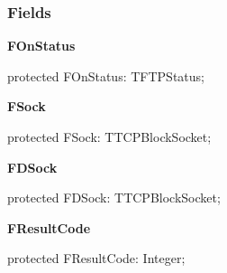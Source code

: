 \documentclass{report}
\newif\ifpdf
\begin{document}
\subsubsection*{\large{\textbf{Fields}}\normalsize\hspace{1ex}\hfill}
\begin{list}{}{
\setlength{\itemindent}{0cm}
\setlength{\listparindent}{0cm}
\setlength{\leftmargin}{\evensidemargin}
\addtolength{\leftmargin}{\tmplength}
\settowidth{\labelsep}{X}
\addtolength{\leftmargin}{\labelsep}
\setlength{\labelwidth}{\tmplength}
}
\label{ftpsend.TFTPSend-FOnStatus}
\item[\textbf{FOnStatus}\hfill]
\ifpdf
\begin{flushleft}
\fi
\begin{ttfamily}
protected FOnStatus: TFTPStatus;\end{ttfamily}

\ifpdf
\end{flushleft}
\fi


\par  \label{ftpsend.TFTPSend-FSock}
\item[\textbf{FSock}\hfill]
\ifpdf
\begin{flushleft}
\fi
\begin{ttfamily}
protected FSock: TTCPBlockSocket;\end{ttfamily}

\ifpdf
\end{flushleft}
\fi


\par  \label{ftpsend.TFTPSend-FDSock}
\item[\textbf{FDSock}\hfill]
\ifpdf
\begin{flushleft}
\fi
\begin{ttfamily}
protected FDSock: TTCPBlockSocket;\end{ttfamily}

\ifpdf
\end{flushleft}
\fi


\par  \label{ftpsend.TFTPSend-FResultCode}
\item[\textbf{FResultCode}\hfill]
\ifpdf
\begin{flushleft}
\fi
\begin{ttfamily}
protected FResultCode: Integer;\end{ttfamily}

\ifpdf
\end{flushleft}
\fi



\end{list}
\end{document}
